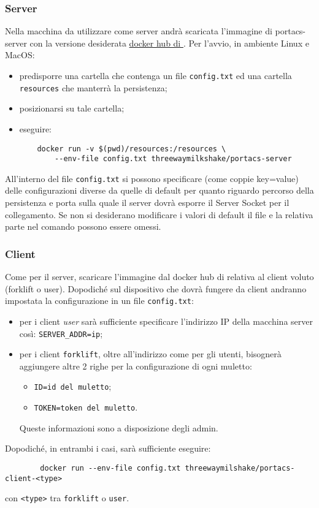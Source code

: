     \subsubsection{Server}
    Nella macchina da utilizzare come server andrà scaricata l'immagine di portacs-server con la versione desiderata \href{https://hub.docker.com/r/threewaymilkshake}{docker hub di \group}.
    Per l'avvio, in ambiente Linux e MacOS:
    \begin{itemize}
        \item predisporre una cartella che contenga un file \texttt{config.txt} ed una cartella \texttt{resources} che manterrà la persistenza;
        \item posizionarsi su tale cartella;
        \item eseguire:
    \begin{verbatim}
    docker run -v $(pwd)/resources:/resources \
        --env-file config.txt threewaymilkshake/portacs-server
    \end{verbatim}
    \end{itemize}
    All'interno del file \texttt{config.txt} si possono specificare (come coppie key=value) delle configurazioni diverse da quelle di default per quanto riguardo percorso della persistenza e porta sulla quale il server dovrà esporre il Server Socket per il collegamento. Se non si desiderano modificare i valori di default il file e la relativa parte nel comando possono essere omessi.

    \subsubsection{Client}
    Come per il server, scaricare l'immagine dal docker hub di \group{} relativa al client voluto (forklift o user). Dopodiché sul dispositivo che dovrà fungere da client andranno impostata la configurazione in un file \texttt{config.txt}:
    \begin{itemize}
        \item per i client \textit{user} sarà sufficiente specificare l'indirizzo IP della macchina server così: \texttt{SERVER\_ADDR=ip};
        \item per i client \texttt{forklift}, oltre all'indirizzo come per gli utenti, bisognerà aggiungere altre 2 righe per la configurazione di ogni muletto:
        \begin{itemize}
            \item \texttt{ID=id del muletto};
            \item \texttt{TOKEN=token del muletto}.
        \end{itemize}
        Queste informazioni sono a disposizione degli admin.
    \end{itemize}

    Dopodiché, in entrambi i casi, sarà sufficiente eseguire:
    \begin{verbatim}
        docker run --env-file config.txt threewaymilshake/portacs-client-<type>
    \end{verbatim}
    con \texttt{<type>} tra \texttt{forklift} o \texttt{user}.


